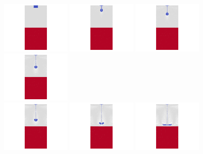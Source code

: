 \begin{center}
\includegraphics[width=3.4cm]{python_codes/fieldstone_67/dripping/converted_0000.jpg}
\includegraphics[width=3.4cm]{python_codes/fieldstone_67/dripping/converted_0001.jpg}
\includegraphics[width=3.4cm]{python_codes/fieldstone_67/dripping/converted_0002.jpg}
\includegraphics[width=3.4cm]{python_codes/fieldstone_67/dripping/converted_0003.jpg}\\
\includegraphics[width=3.4cm]{python_codes/fieldstone_67/dripping/converted_0004.jpg}
\includegraphics[width=3.4cm]{python_codes/fieldstone_67/dripping/converted_0005.jpg}
\includegraphics[width=3.4cm]{python_codes/fieldstone_67/dripping/converted_0006.jpg}

\end{center}
